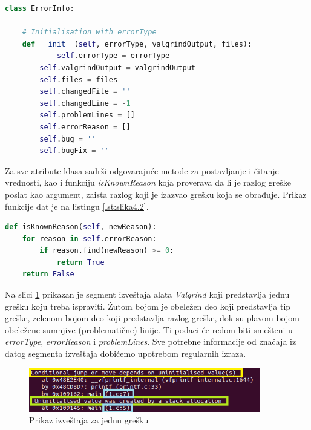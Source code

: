 \documentclass[12pt,oneside]{memoir}
\theoremstyle{plain}
\theoremstyle{definition}
\begin{document}
\begin{lstlisting}[style=mystyle,caption={Potpis klase \textit{ErrorInfo}}, label={lst:slika4.1},language={Python}] 
class ErrorInfo:

	# Initialisation with errorType
	def __init__(self, errorType, valgrindOutput, files):
        	self.errorType = errorType
		self.valgrindOutput = valgrindOutput
		self.files = files
		self.changedFile = ''
		self.changedLine = -1
		self.problemLines = []
		self.errorReason = []
		self.bug = ''
		self.bugFix = ''
\end{lstlisting}

Za sve atribute klasa sadrži odgovarajuće metode za postavljanje i čitanje vrednosti, kao i funkciju  \textit{isKnownReason} koja proverava da li je razlog greške poslat kao argument, zaista razlog koji je izazvao grešku koja se obrađuje. Prikaz funkcije dat je na listingu \ref{lst:slika4.2}.

\begin{lstlisting}[style=mystyle,caption={Prikaz funkcije koja proverava validnost razloga greške}, label={lst:slika4.2},language={Python}] 
def isKnownReason(self, newReason):
	for reason in self.errorReason:
		if reason.find(newReason) >= 0:
			return True
	return False
\end{lstlisting}


Na slici \ref{fig:slika4.3} prikazan je segment izveštaja alata \textit{Valgrind} koji predstavlja jednu grešku koju treba ispraviti. Žutom bojom je obeležen deo koji predstavlja tip greške, zelenom bojom deo koji predstavlja razlog greške, dok su plavom bojom obeležene sumnjive (problematične) linije. Ti podaci će redom biti smešteni u \textit{errorType}, \textit{errorReason} i \textit{problemLines}. Sve potrebne informacije od značaja iz datog segmenta izveštaja dobićemo upotrebom regularnih izraza.

\begin{figure}[!ht]
  \centering
  \includegraphics[width=0.9\textwidth]{ErrorClassExplaination.png}
  \caption{Prikaz izveštaja za jednu grešku}
  \label{fig:slika4.3}
\end{figure}
\end{document}
